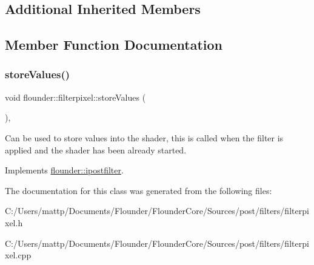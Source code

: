 \subsection*{Additional Inherited Members}


\subsection{Member Function Documentation}
\mbox{\label{classflounder_1_1filterpixel_abc7ae2b0a9bffd4986a664b690aab416}} 
\subsubsection{\texorpdfstring{store\+Values()}{storeValues()}}
{\footnotesize\ttfamily void flounder\+::filterpixel\+::store\+Values (\begin{DoxyParamCaption}{ }\end{DoxyParamCaption})\hspace{0.3cm}{\ttfamily [override]}, {\ttfamily [virtual]}}



Can be used to store values into the shader, this is called when the filter is applied and the shader has been already started. 



Implements \hyperlink{classflounder_1_1ipostfilter_a9b658b4672718d5ac36539875bde722e}{flounder\+::ipostfilter}.



The documentation for this class was generated from the following files\+:\begin{DoxyCompactItemize}
\item 
C\+:/\+Users/mattp/\+Documents/\+Flounder/\+Flounder\+Core/\+Sources/post/filters/filterpixel.\+h\item 
C\+:/\+Users/mattp/\+Documents/\+Flounder/\+Flounder\+Core/\+Sources/post/filters/filterpixel.\+cpp\end{DoxyCompactItemize}
